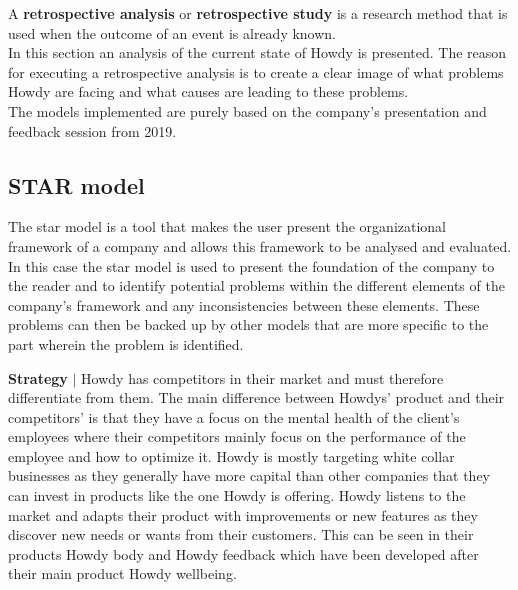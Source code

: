 

A \textbf{retrospective analysis} or \textbf{retrospective study} is a research method that is used when the outcome of an event is already known.\\
\noindent In this section an analysis of the current state of Howdy is presented. The reason for executing a retrospective analysis is to create a clear image of what problems Howdy are facing and what causes are leading to these problems.\\
\noindent The models implemented are purely based on the company’s presentation and feedback session from 2019.



\subsection{STAR model}
The star model is a tool that makes the user present the organizational framework of a company and allows this framework to be analysed and evaluated. In this case the star model is used to present the foundation of the company to the reader and to identify potential problems within the different elements of the company’s framework and any inconsistencies between these elements. These problems can then be backed up by other models that are more specific to the part wherein the problem is identified.

\noindent \textbf{Strategy} $|$ Howdy has competitors in their market and must therefore differentiate from them. The main difference between Howdys' product and their competitors' is that they have a focus on the mental health of the client’s employees where their competitors mainly focus on the performance of the employee and how to optimize it. Howdy is mostly targeting white collar businesses as they generally have more capital than other companies that they can invest in products like the one Howdy is offering.
Howdy listens to the market and adapts their product with improvements or new features as they discover new needs or wants from their customers. This can be seen in their products Howdy body and Howdy feedback which have been developed after their main product Howdy wellbeing.

